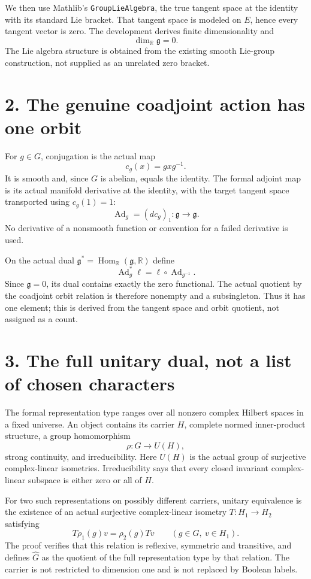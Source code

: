 \documentclass[10pt]{article}
\newcommand{\R}{\mathbb R}\newcommand{\C}{\mathbb C}
\begin{document}
We then use Mathlib's \texttt{GroupLieAlgebra}, the true tangent space at the identity with its standard Lie bracket. That tangent space is modeled on $E$, hence every tangent vector is zero. The development derives finite dimensionality and
\[
\dim_\R\mathfrak g=0.
\]
The Lie algebra structure is obtained from the existing smooth Lie-group construction, not supplied as an unrelated zero bracket.

\section*{2. The genuine coadjoint action has one orbit}
For $g\in G$, conjugation is the actual map
\[
c_g(x)=gxg^{-1}.
\]
It is smooth and, since $G$ is abelian, equals the identity. The formal adjoint map is its actual manifold derivative at the identity, with the target tangent space transported using $c_g(1)=1$:
\[
\operatorname{Ad}_g=(d c_g)_1:\mathfrak g\longrightarrow\mathfrak g.
\]
No derivative of a nonsmooth function or convention for a failed derivative is used.

On the actual dual $\mathfrak g^*=\operatorname{Hom}_\R(\mathfrak g,\R)$ define
\[
\operatorname{Ad}^*_g\ell=\ell\circ\operatorname{Ad}_{g^{-1}}.
\]
Since $\mathfrak g=0$, its dual contains exactly the zero functional. The actual quotient by the coadjoint orbit relation is therefore nonempty and a subsingleton. Thus it has one element; this is derived from the tangent space and orbit quotient, not assigned as a count.

\newpage
\section*{3. The full unitary dual, not a list of chosen characters}
The formal representation type ranges over all nonzero complex Hilbert spaces in a fixed universe. An object contains its carrier $H$, complete normed inner-product structure, a group homomorphism
\[
\rho:G\longrightarrow U(H),
\]
strong continuity, and irreducibility. Here $U(H)$ is the actual group of surjective complex-linear isometries. Irreducibility says that every closed invariant complex-linear subspace is either zero or all of $H$.

For two such representations on possibly different carriers, unitary equivalence is the existence of an actual surjective complex-linear isometry $T:H_1\to H_2$ satisfying
\[
T\rho_1(g)v=\rho_2(g)Tv\qquad(g\in G,\ v\in H_1).
\]
The proof verifies that this relation is reflexive, symmetric and transitive, and defines $\widehat G$ as the quotient of the full representation type by that relation. The carrier is not restricted to dimension one and is not replaced by Boolean labels.
\end{document}
